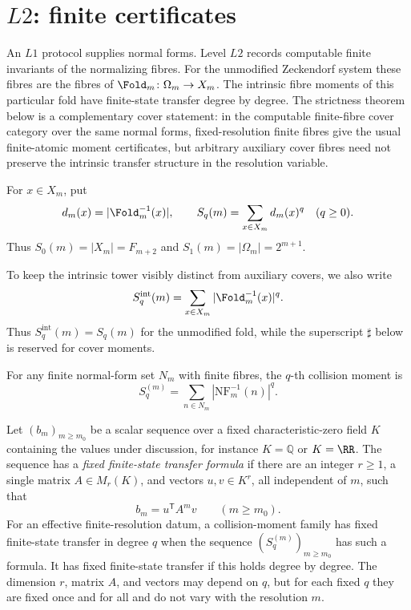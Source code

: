 \section{\texorpdfstring{\(L2\)}{L2}: finite certificates}\label{sec:L2}

An \(L1\) protocol supplies normal forms.  Level \(L2\) records computable
finite invariants of the normalizing fibres.  For the unmodified Zeckendorf
system these fibres are the fibres of \(\Fold_m\colon\Omega_m\to X_m\).  The
intrinsic fibre moments of this particular fold have finite-state transfer
degree by degree.  The strictness theorem below is a complementary cover
statement: in the computable finite-fibre cover category over the same normal
forms, fixed-resolution finite fibres give the usual finite-atomic moment
certificates, but arbitrary auxiliary cover fibres need not preserve the
intrinsic transfer structure in the resolution variable.

For \(x\in X_m\), put
\[
  d_m(x)=|\Fold_m^{-1}(x)|,
  \qquad
  S_q(m)=\sum_{x\in X_m} d_m(x)^q\quad(q\ge0).
\]
Thus \(S_0(m)=|X_m|=F_{m+2}\) and \(S_1(m)=|\Omega_m|=2^{m+1}\).

To keep the intrinsic tower visibly distinct from auxiliary covers, we also
write
\[
  S_q^{\mathrm{int}}(m)=\sum_{x\in X_m}|\Fold_m^{-1}(x)|^q .
\]
Thus \(S_q^{\mathrm{int}}(m)=S_q(m)\) for the unmodified fold, while the
superscript \(\sharp\) below is reserved for cover moments.

\begin{definition}\label{def:collision-moment}
For any finite normal-form set \(N_m\) with finite fibres, the \(q\)-th
collision moment is
\begin{equation}\label{eq:Sq}
  S_q^{(m)}=\sum_{n\in N_m}|\mathrm{NF}_m^{-1}(n)|^q .
\end{equation}
\end{definition}

\begin{definition}\label{def:fixed-finite-state-transfer}
Let \((b_m)_{m\ge m_0}\) be a scalar sequence over a fixed characteristic-zero
field \(K\) containing the values under discussion, for instance
\(K=\mathbb Q\) or \(K=\RR\).  The sequence has a \emph{fixed finite-state
transfer formula} if
there are an integer \(r\ge1\), a single matrix \(A\in M_r(K)\), and vectors
\(u,v\in K^r\), all independent of \(m\), such that
\[
  b_m=u^{\mathsf T}A^m v\qquad(m\ge m_0).
\]
For an effective finite-resolution datum, a collision-moment family has fixed
finite-state transfer in degree \(q\) when the sequence
\((S_q^{(m)})_{m\ge m_0}\) has such a formula.  It has fixed finite-state
transfer if this holds degree by degree.  The dimension \(r\), matrix \(A\), and
vectors may depend on \(q\), but for each fixed \(q\) they are fixed once and for
all and do not vary with the resolution \(m\).
\end{definition}

